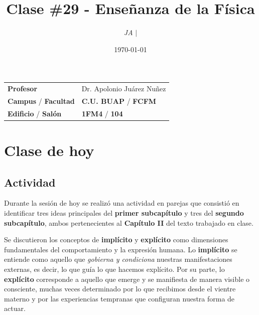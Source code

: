 \documentclass{article}
\title{Clase \#29 - Enseñanza de la Física}
\author{\emph{JA} $\boldsymbol{\mid}$}
\date{\today}
\begin{document}
\maketitle



\begin{mybox}
  \noindent\begin{tabular}{@{}ll}
    {\bfseries{Profesor}} & Dr. Apolonio Juárez Nuñez\\
    \textcolor{prussianblue}{\bfseries{Campus}} / \textcolor{trueblue}{\bfseries{Facultad}}  & \textcolor{prussianblue}{\bfseries{C.U. BUAP}} /  \textcolor{trueblue}{\bfseries{FCFM}} \\
    \textcolor{prussianblue}{\bfseries{Edificio}} /  \textcolor{trueblue}{\bfseries{Salón}}    &   \textcolor{prussianblue}{\bfseries{1FM4}} /  \textcolor{trueblue}{\bfseries{104}}   
  \end{tabular} 
\end{mybox} \vspace{1cm}



\vspace{2cm}
\tableofcontents  \vspace{2cm}

\section{Clase de hoy}

\subsection{Actividad}

Durante la sesión de hoy se realizó una actividad en parejas que consistió en identificar tres ideas principales del \textbf{primer subcapítulo} y tres del \textbf{segundo subcapítulo}, ambos pertenecientes al \textbf{Capítulo II} del texto trabajado en clase.

\medskip

Se discutieron los conceptos de \textbf{implícito} y \textbf{explícito} como dimensiones fundamentales del comportamiento y la expresión humana.  
Lo \textbf{implícito} se entiende como aquello que \emph{gobierna y condiciona} nuestras manifestaciones externas, es decir, lo que guía lo que hacemos explícito.  
Por su parte, lo \textbf{explícito} corresponde a aquello que emerge y se manifiesta de manera visible o consciente, muchas veces determinado por lo que recibimos desde el vientre materno y por las experiencias tempranas que configuran nuestra forma de actuar.
\end{document}
